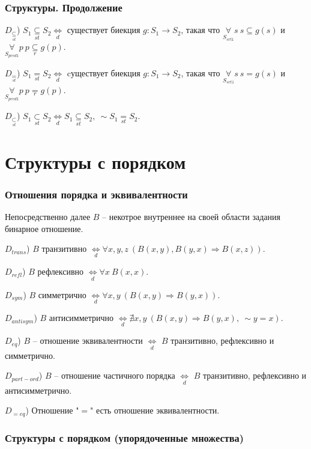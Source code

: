 \documentclass[a4paper]{article}
\newcommand{\Def}[0]{\underset{d}{\Leftrightarrow}}
\newcommand{\eqr}[0]{\underset{r}{=}}
\newcommand{\subseteqr}[0]{\underset{r}{\subseteq}}
\newcommand{\subsetst}[0]{\underset{st}{\subset}}
\newcommand{\subseteqst}[0]{\underset{st}{\subseteq}}
\newcommand{\eqst}[0]{\underset{st}{=}}
\begin{document}
\section{Структуры. Продолжение}

$D_{\subseteqst}$) $S_1 \subseteqst S_2 \Def$ существует биекция $g: S_1 \rightarrow S_2$, такая что $\underset{S_{srt1}}{\forall} s~s \subseteq g(s)$ и $\underset{S_{pred1}}{\forall} p~p \subseteqr g(p)$.

$D_{\eqst}$) $S_1 \eqst S_2 \Def$ cуществует биекция $g: S_1 \rightarrow S_2$, такая что $\underset{S_{srt1}}{\forall} s~s = g(s)$ и $\underset{S_{pred1}}{\forall} p~p \eqr g(p)$.

$D_{\subsetst}$) $S_1 \subsetst S_2 \Def S_1 \subseteqst S_2,~\sim S_1 \eqst S_2$.

\clearpage


\part{Структуры с порядком}

\section{Отношения порядка и эквивалентности}

Непосредственно далее $B$ -- некотрое внутреннее на своей области задания бинарное отношение.

$D_{trans}$) $B$ транзитивно $\Def \forall x, y, z~(B(x, y), B(y, x) \Rightarrow B(x, z))$.

$D_{refl}$) $B$ рефлексивно $\Def \forall x~B(x, x)$.

$D_{sym}$) $B$ симметрично $\Def \forall x, y~(B(x, y) \Rightarrow B(y, x))$.

$D_{antisym}$) $B$ антисимметрично $\Def \nexists x, y~(B(x, y) \Rightarrow B(y, x),~\sim y = x)$.

$D_{eq}$) $B$ -- отношение эквивалентности $\Def$ $B$ транзитивно, рефлексивно и симметрично.

$D_{part-ord}$) $B$ -- отношение частичного порядка $\Def$ $B$ транзитивно, рефлексивно и антисимметрично.

$D_{=eq}$) Отношение "$=$" есть отношение эквивалентности.

\section{Структуры с порядком (упорядоченные множества)}
\end{document}
